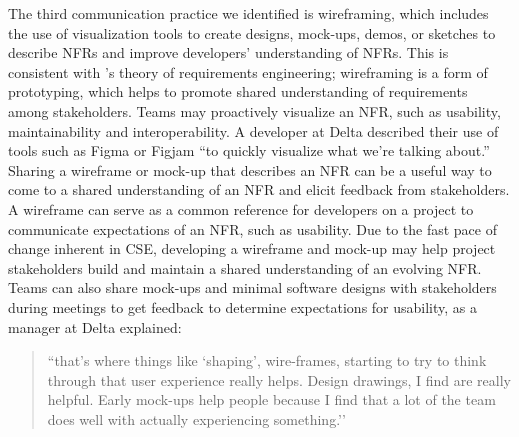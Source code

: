 \documentclass[smallextended]{svjour3}       %
\begin{document}
The third communication practice we identified is wireframing, which includes the use of visualization tools to create designs, mock-ups, demos, or sketches to describe NFRs and improve developers' understanding of NFRs.
This is consistent with \citet{wagner2019status}'s theory of requirements engineering; wireframing is a form of prototyping, which helps to promote shared understanding of requirements among stakeholders.
Teams may proactively visualize an NFR, such as usability, maintainability and interoperability. A developer at Delta described their use of tools such as Figma or Figjam \textmd{``to quickly visualize what we're talking about.''}
Sharing a wireframe or mock-up that describes an NFR can be a useful way to come to a shared understanding of an NFR and elicit feedback from stakeholders. A wireframe can serve as a common reference for developers on a project to communicate expectations of an NFR, such as usability. Due to the fast pace of change inherent in CSE, 
developing a wireframe and mock-up may help project stakeholders build and maintain a shared understanding of an evolving NFR.
Teams can also share mock-ups and minimal software designs with stakeholders during meetings to get feedback to determine expectations for usability, as a manager at Delta explained:
\begin{quote}
    ``that’s where things like `shaping’, wire-frames, starting to try to think through that user experience really helps. Design drawings, I find are really helpful. Early mock-ups help people because I find that a lot of the team does well with actually experiencing something.''    
\end{quote}    
\end{document}
